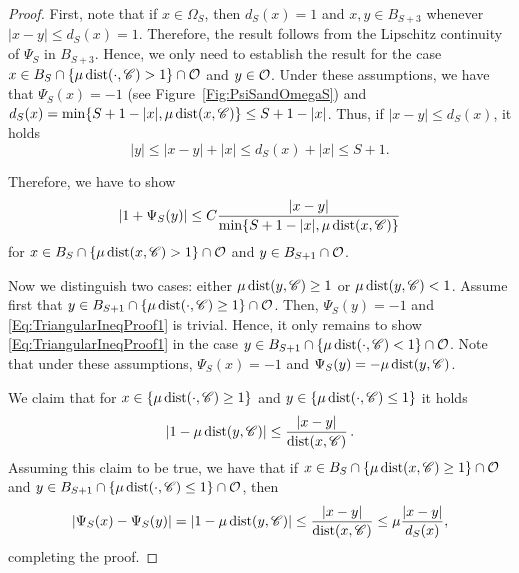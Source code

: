 \begin{proof}
First, note that if $x\in \Omega_S$, then $d_S(x)=1$ and $x,y\in B_{S+3}$ whenever $|x-y|\leq d_S(x)=1$. Therefore, the result follows from the Lipschitz continuity of $\Psi_S$ in $B_{S+3}$. Hence, we only need to establish the result for the case $x\in B_S\cap \{\mu \operatorname{dist}(\cdot,\mathscr{C})> 1\} \cap \mathcal{O}$ and $y\in \mathcal{O}$. Under these assumptions, we have that $\Psi_S(x)=-1$ (see Figure~\ref{Fig:PsiSandOmegaS}) and $d_S(x) = \min\{S+1-|x|,\mu \operatorname{dist}(x,\mathscr{C})\} \leq S+1-|x|$. Thus, if $|x-y|\leq d_S(x)$, it holds
$$
 |y|\leq |x-y| + |x| \leq d_S(x)+|x| \leq S+1. 
$$

Therefore, we have to show
\begin{equation}
\label{Eq:TriangularIneqProof1}
	|1+\Psi_S(y)|\leq C\dfrac{|x-y|}{\min\{S+1-|x|,\mu \operatorname{dist}(x,\mathscr{C})\}}
\end{equation}
for $x\in B_S\cap \{\mu\operatorname{dist}(x,\mathscr{C})>1\} \cap \mathcal{O}$ and $y \in B_{S+1}\cap \mathcal{O}$.

Now we distinguish two cases: either $\mu\operatorname{dist}(y,\mathscr{C})\geq 1$ or $\mu \operatorname{dist}(y,\mathscr{C})< 1$. Assume first that $y\in B_{S+1} \cap \{\mu \operatorname{dist}(\cdot,\mathscr{C})\geq 1\}\cap \mathcal{O}$. Then, $\Psi_S(y)=-1$ and \eqref{Eq:TriangularIneqProof1} is trivial. Hence, it only remains to show \eqref{Eq:TriangularIneqProof1} in the case $y\in B_{S+1} \cap \{\mu \operatorname{dist}(\cdot,\mathscr{C}) < 1\}\cap \mathcal{O}$. Note that under these assumptions, $\Psi_S(x)=-1$ and $\Psi_S(y)=-\mu \operatorname{dist}(y,\mathscr{C})$. 

We claim that for $x \in \{\mu \operatorname{dist}(\cdot,\mathscr{C})\geq 1\}$ and $y \in \{\mu \operatorname{dist}(\cdot,\mathscr{C})\leq 1\}$ it holds
\begin{equation}
\label{Eq:TriangularIneqProof2}
|1-\mu \operatorname{dist}(y,\mathscr{C})|\leq \dfrac{|x-y|}{\operatorname{dist}(x,\mathscr{C})}\,.
\end{equation}
Assuming this claim to be true, we have that if $x\in B_S\cap \{\mu \operatorname{dist}(x,\mathscr{C})\geq 1\} \cap \mathcal{O}$ and $y\in B_{S+1} \cap \{\mu \operatorname{dist}(\cdot,\mathscr{C})\leq 1\}\cap \mathcal{O}$, then
$$ 
|\Psi_S(x)-\Psi_S(y)| = |1-\mu \operatorname{dist}(y,\mathscr{C})| \leq \frac{|x-y|}{\operatorname{dist}(x,\mathscr{C})} \leq  \mu \frac{|x-y|}{d_S(x)},
$$
completing the proof.


\end{proof}
